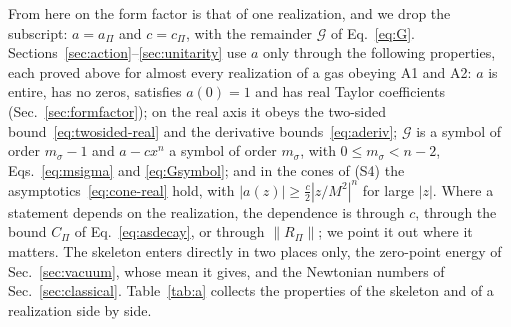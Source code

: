 \documentclass[aps,prd,10pt,twocolumn,superscriptaddress,nofootinbib,floatfix,longbibliography]{revtex4-2}
\begin{document}
From here on the form factor is that of one realization, and we drop the subscript: $a=a_\Pi$ and $c=c_\Pi$, with the remainder $\mathcal G$ of Eq.~\eqref{eq:G}. Sections~\ref{sec:action}--\ref{sec:unitarity} use $a$ only through the following properties, each proved above for almost every realization of a gas obeying A1 and A2: $a$ is entire, has no zeros, satisfies $a(0)=1$ and has real Taylor coefficients (Sec.~\ref{sec:formfactor}); on the real axis it obeys the two-sided bound~\eqref{eq:twosided-real} and the derivative bounds~\eqref{eq:aderiv}; $\mathcal G$ is a symbol of order $m_\sigma-1$ and $a-cx^n$ a symbol of order $m_\sigma$, with $0\le m_\sigma<n-2$, Eqs.~\eqref{eq:msigma} and \eqref{eq:Gsymbol}; and in the cones of (S4) the asymptotics~\eqref{eq:cone-real} hold, with $|a(z)|\ge\frac c2|z/M^2|^n$ for large $|z|$. Where a statement depends on the realization, the dependence is through $c$, through the bound $C_\Pi$ of Eq.~\eqref{eq:asdecay}, or through $\|R_\Pi\|$; we point it out where it matters. The skeleton enters directly in two places only, the zero-point energy of Sec.~\ref{sec:vacuum}, whose mean it gives, and the Newtonian numbers of Sec.~\ref{sec:classical}. Table~\ref{tab:a} collects the properties of the skeleton and of a realization side by side.
\end{document}
